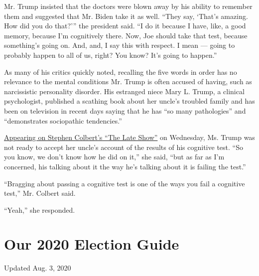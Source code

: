 Mr. Trump insisted that the doctors were blown away by his ability to
remember them and suggested that Mr. Biden take it as well. ``They say,
`That's amazing. How did you do that?''' the president said. ``I do it
because I have, like, a good memory, because I'm cognitively there. Now,
Joe should take that test, because something's going on. And, and, I say
this with respect. I mean --- going to probably happen to all of us,
right? You know? It's going to happen.''

As many of his critics quickly noted, recalling the five words in order
has no relevance to the mental conditions Mr. Trump is often accused of
having, such as narcissistic personality disorder. His estranged niece
Mary L. Trump, a clinical psychologist, published a scathing book about
her uncle's troubled family and has been on television in recent days
saying that he has ``so many pathologies'' and ``demonstrates
sociopathic tendencies.''

\href{https://www.youtube.com/watch?v=rOkx-PAHUrQ}{Appearing on Stephen
Colbert's ``The Late Show''} on Wednesday, Ms. Trump was not ready to
accept her uncle's account of the results of his cognitive test. ``So
you know, we don't know how he did on it,'' she said, ``but as far as
I'm concerned, his talking about it the way he's talking about it is
failing the test.''

``Bragging about passing a cognitive test is one of the ways you fail a
cognitive test,'' Mr. Colbert said.

``Yeah,'' she responded.

\hypertarget{our-2020-election-guide}{%
\section{Our 2020 Election Guide}\label{our-2020-election-guide}}

Updated Aug. 3, 2020


